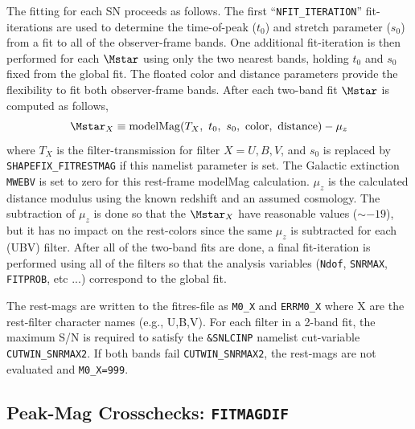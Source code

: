 \documentclass[12pt]{article}
\begin{document}
The fitting for each SN proceeds as follows.
The first ``{\tt NFIT\_ITERATION}'' fit-iterations are used
to determine the time-of-peak ($t_0$) and stretch parameter
($s_0$) from a fit to all of the observer-frame bands. 
One additional fit-iteration is then performed for each 
$\Mstar$ using only the two nearest bands, 
holding $t_0$ and $s_0$ fixed from the global fit.
The floated color and distance parameters provide the 
flexibility to fit both observer-frame bands. 
After each two-band fit $\Mstar$ is computed as follows,
\begin{equation}
  \Mstar_X \equiv  {\rm modelMag}(T_X,~t_0,~s_0,~{\rm color,~distance})
        - {\mu}_z
\end{equation}
%
where $T_X$ is the filter-transmission for filter $X=U,B,V$,
and $s_0$ is replaced by {\tt SHAPEFIX\_FITRESTMAG} 
if this namelist parameter is set. 
The Galactic extinction {\tt MWEBV} is set to zero for 
this rest-frame modelMag calculation.
$\mu_z$ is the calculated distance modulus using the known
redshift and an assumed cosmology. The subtraction of $\mu_z$
is done so that the $\Mstar_X$ have reasonable values ($\sim -19$),
but it has no impact on the rest-colors since the same $\mu_z$
is subtracted for each (UBV) filter. After all of the two-band
fits are done, a final fit-iteration is performed using all
of the filters so that the analysis variables 
({\tt Ndof}, {\tt SNRMAX}, {\tt FITPROB}, etc ...) 
correspond to the global fit.


The rest-mags are written to the fitres-file
as {\tt M0\_X} and {\tt ERRM0\_X} where X are the 
rest-filter character names (e.g., U,B,V).
For each filter in a 2-band fit, the maximum S/N 
is required to satisfy the {\tt \&SNLCINP} namelist 
cut-variable {\tt CUTWIN\_SNRMAX2}.
If both bands fail {\tt CUTWIN\_SNRMAX2}, the rest-mags 
are not evaluated and {\tt M0\_X=999}.


   \clearpage
   \subsection{Peak-Mag Crosschecks: {\tt FITMAGDIF}}
   \label{subsec:FITMAGDIF}
\end{document}
